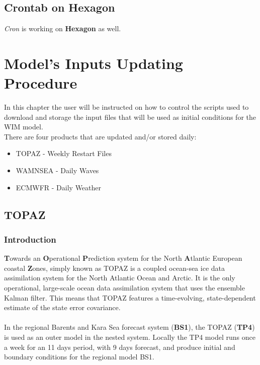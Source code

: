 \documentclass[12pt,a4paper]{report}
\begin{document}
\section{Crontab on Hexagon}
\textit{Cron} is working on \textbf{Hexagon} as well. 
\chapter{Model's Inputs Updating Procedure}

%


In this chapter the user will be instructed on how to control the scripts used to download and storage the input files that will be used as initial conditions for the WIM model.\\
There are four products that are updated and/or stored daily:
\begin{itemize}
\item TOPAZ - Weekly Restart Files
\item WAMNSEA - Daily Waves 
\item ECMWFR - Daily Weather
\end{itemize}

\section{TOPAZ}
\subsection{Introduction}
\textbf{T}owards an \textbf{O}perational \textbf{P}rediction system for the North \textbf{A}tlantic European coastal \textbf{Z}ones, simply known as TOPAZ is a coupled ocean-sea ice data assimilation system for the North Atlantic Ocean and Arctic. It is the only operational, large-scale ocean data assimilation system that uses the ensemble Kalman filter. This means that TOPAZ features a time-evolving, state-dependent estimate of the state error covariance. \\ \\
In the regional Barents and Kara Sea forecast system (\textbf{BS1}), the TOPAZ (\textbf{TP4}) is used as an outer model in the nested system. Locally the TP4 model runs once a week for an 11 days period, with 9 days forecast, and produce initial and boundary conditions for the regional model BS1.
\end{document}
